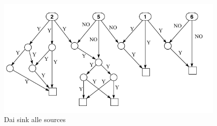 \documentclass[12pt]{article}
\begin{document}
			\begin{figure}[h!]
				\centering
				\includegraphics[scale=0.55]{img/yod.png}
				\caption{Dai sink alle sources}
			\end{figure}
		
\end{document}
